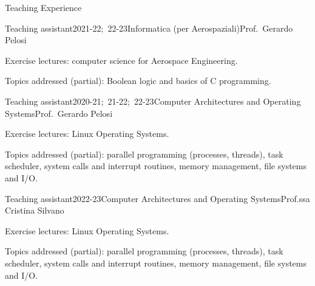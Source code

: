 \documentclass{resume} %
\begin{document}
\begin{rSection}{Teaching Experience}

  \begin{rSubsection}{Teaching assistant}{2021-22;\ 22-23}{Informatica (per Aerospaziali)}{Prof.\ Gerardo Pelosi}
  \item Exercise lectures: computer science for Aerospace Engineering.
  \item Topics addressed (partial): Boolean logic and basics of C programming.
  \end{rSubsection}
  \begin{rSubsection}{Teaching assistant}{2020-21;\ 21-22;\ 22-23}{Computer Architectures and Operating Systems}{Prof.\ Gerardo Pelosi}
  \item Exercise lectures: Linux Operating Systems.
  \item Topics addressed (partial): parallel programming (processes, threads),
    task scheduler, system calls and interrupt routines, memory management, file
    systems and I/O.
  \end{rSubsection}
  \begin{rSubsection}{Teaching assistant}{2022-23}{Computer Architectures and
      Operating Systems}{Prof.ssa Cristina Silvano }
  \item Exercise lectures: Linux Operating Systems.
  \item Topics addressed (partial): parallel programming (processes, threads),
    task scheduler, system calls and interrupt routines, memory management, file
    systems and I/O.
  \end{rSubsection}



\end{rSection}
\end{document}
